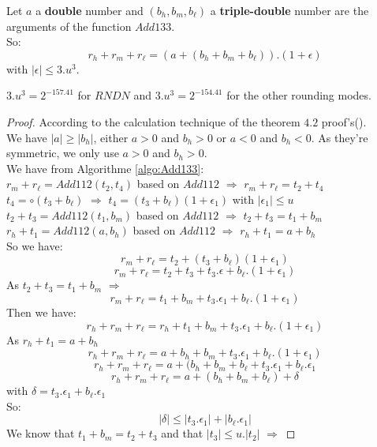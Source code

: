\begin{theo}

Let $a$ a \textbf{double} number and $(b_h,b_m,b_{\ell})$ a \textbf{triple-double} number are the arguments of the function $Add133$.\\
So:\\
$$r_h +r_m +r_{\ell} = (a + (b_h+ b_m +b_{\ell})).(1+\epsilon)$$ with $\lvert \epsilon \rvert \le 3.u^3$.
\label{the1:Add133}
\end{theo}

$3.u^3= 2^{-157.41}$ for $RNDN$ and $3.u^3 = 2^{-154.41}$ for the other rounding modes.
\begin{proof} \color{-yellow}
According to the calculation technique of the theorem $4.2$ proof's(\cite{lauter2005basic}).\\
We have $\lvert a \rvert \ge \lvert b_h \rvert$, either $a > 0$ and $b_h > 0$ or $a < 0$ and $b_h < 0$. As they're symmetric, we only use $a > 0$ and $b_h > 0$.\\
We have from Algorithme \ref{algo:Add133}:\\
$r_m + r_{\ell} = Add112(t_2,t_4)$ based on $Add112$  $\Rightarrow$ $r_m + r_{\ell} = t_2+t_4$\\
$t_4 = \circ(t_3+b_{\ell})$ $\Rightarrow$ $t_4 = (t_3 +b_{\ell})(1+\epsilon_1)$ with $\lvert \epsilon_1 \rvert \le u$\\
$t_2+ t_3 = Add112(t_1,b_m)$ based on $Add112$  $\Rightarrow$ $t_2+ t_3 = t_1+b_m$\\
$r_h + t_1 = Add112(a,b_h)$ based on $Add112$  $\Rightarrow$ $r_h + t_1 = a+b_h$\\
So we have:
$$r_m + r_{\ell} = t_2+(t_3 +b_{\ell})(1+\epsilon_1)$$
$$r_m + r_{\ell} = t_2+t_3 + t_3.\epsilon+ b_{\ell}.(1+\epsilon_1)$$
As $t_2 + t_3 = t_1 +b_m$ $\Rightarrow$
$$r_m + r_{\ell} = t_1 +b_m + t_3.\epsilon_1+ b_{\ell}.(1+\epsilon_1)$$
Then we have:
$$r_h + r_m + r_{\ell} = r_h +t_1 +b_m + t_3.\epsilon_1+ b_{\ell}.(1+\epsilon_1)$$
As $r_h +t_1 = a + b_h$
$$r_h + r_m + r_{\ell} = a + b_h +b_m + t_3.\epsilon_1+ b_{\ell}.(1+\epsilon_1)$$
$$r_h + r_m + r_{\ell} = a + (b_h +b_m + b_{\ell}+ t_3.\epsilon_1+ b_{\ell}.\epsilon_1$$
$$r_h + r_m + r_{\ell} = a + (b_h +b_m + b_{\ell})+ \delta$$
with $\delta = t_3.\epsilon_1+ b_{\ell}.\epsilon_1 $\\
So:
$$ \lvert \delta \rvert \le \lvert t_3.\epsilon_1 \rvert +\lvert b_{\ell}.\epsilon_1 \rvert $$
We know that $t_1 + b_m = t_2 + t_3$ and that $ \lvert t_3 \rvert \le u.\lvert t_2 \rvert $ $\Rightarrow$ 

\end{proof}
